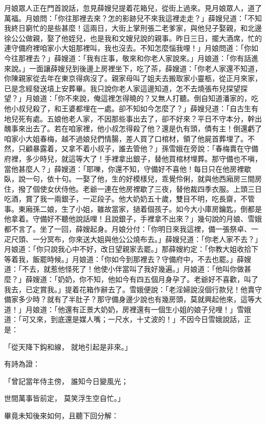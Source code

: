 月娘眾人正在門首說話，忽見薛嫂兒提着花箱兒，從街上過來。見月娘眾人，道了萬福。月娘問：「你往那裡去來？怎的影跡兒不來我這裡走走？」薛嫂兒道：「不知我終日窮忙的是些甚麼！這兩日，大街上掌刑張二老爹家，與他兒子娶親，和北邊徐公公做親，娶了他姪兒，也是我和文嫂兒說的親事。昨日三日，擺大酒席，忙的連守備府裡咱家小大姐那裡叫，我也沒去。不知怎麼惱我哩！」月娘問道：「你如今往那裡去？」薛嫂道：「我有庄事，敬來和你老人家說來。」月娘道：「你有話進來說。」一面讓薛嫂兒到後邊上房裡坐下，吃了茶，薛嫂道：「你老人家還不知道，你陳親家從去年在東京得病沒了。親家母叫了姐夫去搬取家小靈柩，從正月來家，已是念經發送墳上安葬畢。我只說你老人家這邊知道，怎不去燒張布兒探望探望？」月娘道：「你不來說，俺這裡怎得曉的？又無人打聽。倒自知道潘家的，吃他小叔兒殺了，和王婆都埋在一處。卻不知如今怎麼了？」薛嫂兒道：「自古生有地兒死有處。五娘他老人家，不因那些事出去了，卻不好來？平日不守本分，幹出醜事來出去了。若在咱家裡，他小叔怎得殺了他？還是仇有頭，債有主！倒還虧了咱家小大姐春梅，越不過娘兒們情腸，差人買了口棺材，領了他屍首葬埋了。不然，只顧暴露着，又拿不着小叔子，誰去管他？」孫雪娥在旁說：「春梅賣在守備府裡，多少時兒，就這等大了！手裡拿出銀子，替他買棺材埋葬。那守備也不嗔，當他甚麼人？」薛嫂道：「耶嚛，你還不知，守備好不喜他！每日只在他房裡歇臥，說一句，依十句。一娶了他，生的好模樣兒，乖覺伶俐，就與他西廂房三間房住，撥了個使女伏侍他。老爺一連在他房裡歇了三夜，替他裁四季衣服。上頭三日吃酒，賞了我一兩銀子，一疋段子。他大奶奶五十歲，雙目不明，吃長齋，不管事。東廂孫二娘，生了小姐，雖故當家，撾着個孩子。如今大小庫房鑰匙，倒都是他拿着。守備好不聽他說話哩！且說銀子，手裡拿不出來？」幾句說的月娘、雪娥都不言了。坐了一回，薛嫂起身。月娘分付：「你明日來我這裡，備一張祭卓、一疋尺頭、一分冥布，你來送大姐與他公公燒布去。」薛嫂兒道：「你老人家不去？」月娘道：「你只說我心中不好，改日望親家去罷。」那薛嫂約定：「你教大姐收拾下等着我，飯罷時候。」月娘道：「你如今到那裡去？守備府中，不去也罷。」薛嫂道：「不去，就惹他怪死了！他使小伴當叫了我好幾遍。」月娘道：「他叫你做甚麼？」薛嫂道：「奶奶，你不知，他如今有四五個月身孕了。老爺好不喜歡，叫了我去，已定賞我。」提着花箱作辭去了。雪娥便說：「老淫婦說沒個行款兒！他賣守備家多少時？就有了半肚子？那守備身邊少說也有幾房頭，莫就興起他來，這等大道！」月娘道：「他還有正景大奶奶，房裡還有一個生小姐的娘子兒哩！」雪娥道：「可又來，到底還是媒人嘴；一尺水，十丈波的！」不因今日雪娥說話，正是：

「從天降下鈎和線，  就地引起是非來。」

有詩為證：

「曾記當年侍主傍，  誰知今日變風光；

世間萬事皆前定，  莫笑浮生空自忙。」

畢竟未知後來如何，且聽下回分解：

